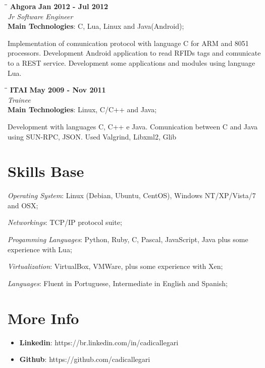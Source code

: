 \documentclass[margin]{res}
\begin{document}
\begin{resume}
   \begin{tabbing}
   \hspace{2.3in}\= \hspace{1.5in}\= \kill %
    \textbf{Ahgora}    \>\>\textbf{Jan 2012 - Jul 2012}\\
    \textit{Jr Software Engineer}\\   
    \textbf{Main Technologies}: C, Lua, Linux and Java(Android);
   \end{tabbing}\vspace{-20pt}      %
    \vspace{2mm}
Implementation of comunication protocol with language C for ARM and 8051 processors.
Development Android application to read RFIDs tags and comunicate to a REST service.
Development some applications and modules using language Lua.

       
   \begin{tabbing}
   \hspace{2.3in}\= \hspace{1.5in}\= \kill %
    \textbf{ITAI}    \>\>\textbf{May 2009 - Nov 2011}\\
    \textit{Trainee}\\   
    \textbf{Main Technologies}: Linux, C/C++ and Java;
   \end{tabbing}\vspace{-20pt}      %
    \vspace{2mm}
       Development with languages C, C++ e Java. Comunication between C and Java using SUN-RPC, JSON. Used Valgrind, Libxml2, Glib

\section{Skills Base}  \textit{Operating System}:  Linux (Debian, Ubuntu, CentOS), Windows NT/XP/Vista/7 and OSX;

      \textit{Networkings}: TCP/IP protocol suite;
  
      \textit{Progamming Languages}: Python, Ruby, C, Pascal, JavaScript, Java plus some experience with Lua;
  
      \textit{Virtualization}: VirtualBox, VMWare, plus some experience with Xen;

      \textit{Languages}: Fluent in Portuguese, Intermediate in English and Spanish;
 
\section{More Info}
    \begin{itemize}
        \item \textbf{Linkedin}: https://br.linkedin.com/in/cadicallegari
         \item \textbf{Github}: https://github.com/cadicallegari
    \end{itemize}


\end{resume} 
\end{document}
